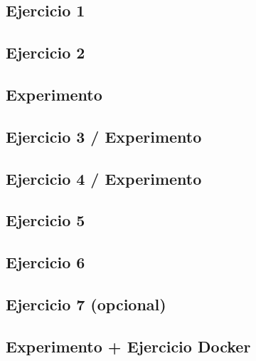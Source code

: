 \subsection{Ejercicio 1}

\subsection{Ejercicio 2}

\subsection{Experimento}

\subsection{Ejercicio 3 / Experimento}

\subsection{Ejercicio 4 / Experimento}

\subsection{Ejercicio 5}

\subsection{Ejercicio 6}

\subsection{Ejercicio 7 (opcional)}

\subsection{Experimento + Ejercicio Docker}

